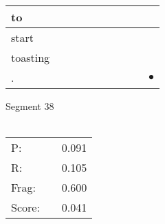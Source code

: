 \documentclass[landscape]{article}
\newcommand{\ssp}{\hspace{2pt}}
\newcommand{\mex}{\cellcolor{g}$\bullet$}
\begin{document}
\begin{tabular}{|l|p{10pt}|p{10pt}|p{10pt}|p{10pt}|p{10pt}|p{10pt}|p{10pt}|p{10pt}|p{10pt}|}
\hline
\ssp to \ssp&\hspace{2pt}&\hspace{2pt}&\hspace{2pt}&\hspace{2pt}&\hspace{2pt}&\hspace{2pt}&\hspace{2pt}&\hspace{2pt}&\hspace{2pt}\\
\hline
\ssp start \ssp&\hspace{2pt}&\hspace{2pt}&\hspace{2pt}&\hspace{2pt}&\hspace{2pt}&\hspace{2pt}&\hspace{2pt}&\hspace{2pt}&\hspace{2pt}\\
\hline
\ssp toasting \ssp&\hspace{2pt}&\hspace{2pt}&\hspace{2pt}&\hspace{2pt}&\hspace{2pt}&\hspace{2pt}&\hspace{2pt}&\hspace{2pt}&\hspace{2pt}\\
\hline
\ssp \cellcolor{ref8}. \ssp&\hspace{2pt}&\hspace{2pt}&\hspace{2pt}&\hspace{2pt}&\hspace{2pt}&\hspace{2pt}&\hspace{2pt}&\hspace{2pt}&\hspace{2pt}\mex\\
\hline
\end{tabular}

\vspace{6pt}
\noindent Segment 38\\\\
\noindent\begin{tabular}{lm{12pt}r}
\hline
P:&&0.091\\
R:&&0.105\\
Frag:&&0.600\\
Score:&&0.041\\
\end{tabular}
\end{document}
